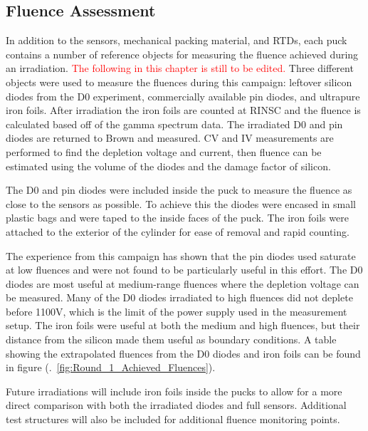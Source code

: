 \subsection{Fluence Assessment}

In addition to the sensors, mechanical packing material, and RTDs, each puck contains a number of reference objects for measuring the fluence achieved during an irradiation. 
\textcolor{red}{The following in this chapter is still to be edited.}\newline
Three different objects were used to measure the fluences during this campaign: leftover silicon diodes from the D0 experiment, commercially available pin diodes, and ultrapure iron foils. 
After irradiation the iron foils are counted at RINSC and the fluence is calculated based off of the gamma spectrum data.
The irradiated D0 and pin diodes are returned to Brown and measured.
CV and IV measurements are performed to find the depletion voltage and current, then fluence can be estimated using the volume of the diodes and the damage factor of silicon.

The D0 and pin diodes were included inside the puck to measure the fluence as close to the sensors as possible.
To achieve this the diodes were encased in small plastic bags and were taped to the inside faces of the puck. 
The iron foils were attached to the exterior of the cylinder for ease of removal and rapid counting. 

The experience from this campaign has shown that the pin diodes used saturate at low fluences and were not found to be particularly useful in this effort. 
The D0 diodes are most useful at medium-range fluences where the depletion voltage can be measured. 
Many of the D0 diodes irradiated to high fluences did not deplete before 1100V, which is the limit of the power supply used in the measurement setup. 
The iron foils were useful at both the medium and high fluences, but their distance from the silicon made them useful as boundary conditions. 
A table showing the extrapolated fluences from the D0 diodes and iron foils can be found in figure (.~\ref{fig:Round_1_Achieved_Fluences}).

Future irradiations will include iron foils inside the pucks to allow for a more direct comparison with both the irradiated diodes and full sensors. 
Additional test structures will also be included for additional fluence monitoring points.


